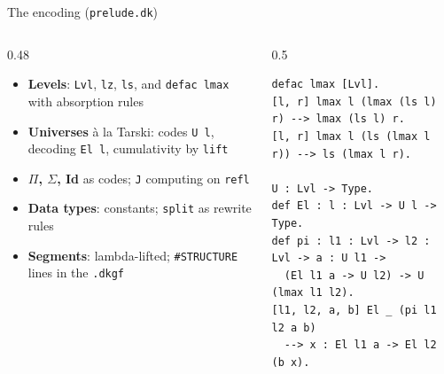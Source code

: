 \documentclass[10pt,aspectratio=169]{beamer}
\newcommand{\file}[1]{\texttt{#1}}
\begin{document}
\begin{frame}[fragile]{The encoding (\file{prelude.dk})}

\begin{columns}[T]
\begin{column}{0.48\textwidth}
\small
\begin{itemize}
\item \textbf{Levels}: \texttt{Lvl}, \texttt{lz}, \texttt{ls}, and
  \texttt{defac lmax} with absorption rules
\item \textbf{Universes} \`a la Tarski: codes \texttt{U l}, decoding
  \texttt{El l}, cumulativity by \texttt{lift}
\item \textbf{$\Pi$, $\Sigma$, Id} as codes; \texttt{J} computing on
  \texttt{refl}
\item \textbf{Data types}: constants; \texttt{split} as rewrite rules
\item \textbf{Segments}: lambda-lifted; \texttt{\#STRUCTURE} lines in the
  \file{.dkgf}
\end{itemize}
\end{column}
\begin{column}{0.5\textwidth}
\begin{lstlisting}
defac lmax [Lvl].
[l, r] lmax l (lmax (ls l) r) --> lmax (ls l) r.
[l, r] lmax l (ls (lmax l r)) --> ls (lmax l r).

U : Lvl -> Type.
def El : l : Lvl -> U l -> Type.
def pi : l1 : Lvl -> l2 : Lvl -> a : U l1 ->
  (El l1 a -> U l2) -> U (lmax l1 l2).
[l1, l2, a, b] El _ (pi l1 l2 a b)
  --> x : El l1 a -> El l2 (b x).
\end{lstlisting}
\end{column}
\end{columns}

\end{frame}
\end{document}
